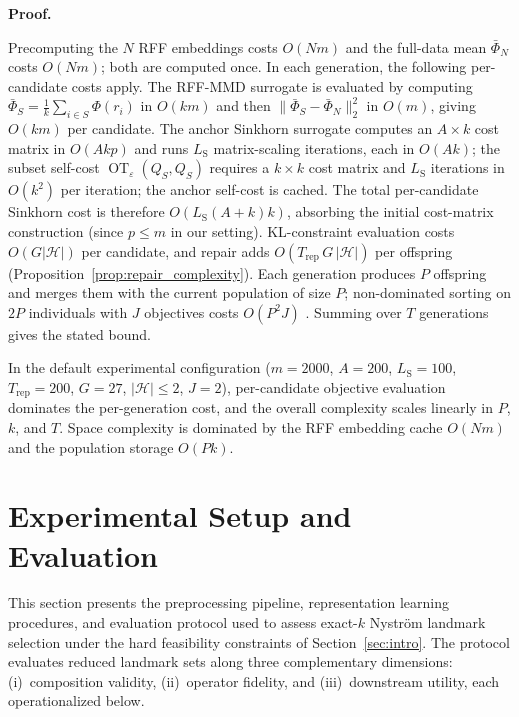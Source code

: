 \documentclass[10pt,journal]{IEEEtran}
\makeatletter
\newcommand{\1}{\mathbf{1}}
\DeclareMathOperator{\OT}{OT}
\theoremstyle{ieeethm}
\renewcommand{\IEEEproofname}{Proof}
\renewenvironment{IEEEproof}[1][\IEEEproofname]{%
  \par\pushQED{\IEEEQED}%
  \normalfont
  \topsep6\p@\@plus6\p@\relax
  \trivlist
  \item[]\textbf{#1.}\ignorespaces
}{%
  \popQED\endtrivlist\@endpefalse
}
\makeatother
\begin{document}
\begin{IEEEproof}
Precomputing the $N$ RFF embeddings costs $O(Nm)$ and the full-data mean
$\bar\Phi_N$ costs $O(Nm)$; both are computed once. In each generation, the
following per-candidate costs apply. The RFF-MMD surrogate is evaluated by
computing $\bar\Phi_S=\frac{1}{k}\sum_{i\in S}\Phi(r_i)$ in $O(km)$ and then
$\|\bar\Phi_S-\bar\Phi_N\|_2^2$ in $O(m)$, giving $O(km)$ per candidate. The
anchor Sinkhorn surrogate computes an $A\times k$ cost matrix in $O(Akp)$ and
runs $L_{\mathrm{S}}$ matrix-scaling iterations, each in $O(Ak)$; the subset
self-cost $\OT_{\varepsilon}(Q_S,Q_S)$ requires a $k\times k$ cost matrix and
$L_{\mathrm{S}}$ iterations in $O(k^2)$ per iteration; the anchor self-cost is
cached. The total per-candidate Sinkhorn cost is therefore
$O(L_{\mathrm{S}}(A+k)k)$, absorbing the initial cost-matrix construction
(since $p\le m$ in our setting). KL-constraint evaluation costs $O(G|\mathcal{H}|)$
per candidate, and repair adds $O(T_{\mathrm{rep}}\,G\,|\mathcal{H}|)$ per
offspring (Proposition~\ref{prop:repair_complexity}). Each generation produces
$P$ offspring and merges them with the current population of size $P$;
non-dominated sorting on $2P$ individuals with $J$ objectives costs $O(P^2 J)$
\cite{deb2002nsga2}. Summing over $T$ generations gives the stated bound.
\end{IEEEproof}

In the default experimental configuration ($m=2000$, $A=200$, $L_{\mathrm{S}}=100$,
$T_{\mathrm{rep}}=200$, $G=27$, $|\mathcal{H}|\le 2$, $J=2$), per-candidate
objective evaluation dominates the per-generation cost, and the overall
complexity scales linearly in $P$, $k$, and $T$. Space complexity is dominated by
the RFF embedding cache $O(Nm)$ and the population storage $O(Pk)$.



\section{Experimental Setup and Evaluation}
\label{sec:exp_eval}

This section presents the preprocessing pipeline, representation learning procedures, and evaluation protocol used to assess exact-$k$ Nyström landmark selection under the hard feasibility constraints of Section~\ref{sec:intro}. The protocol evaluates reduced landmark sets along three complementary dimensions: (i)~composition validity, (ii)~operator fidelity, and (iii)~downstream utility, each operationalized below.
\end{document}
